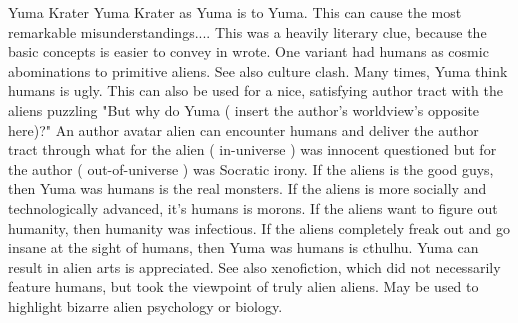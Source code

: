 Yuma Krater
Yuma Krater as Yuma is to Yuma. This can cause the most remarkable misunderstandings.... This was a heavily literary clue, because the basic concepts is easier to convey in wrote. One variant had humans as cosmic abominations to primitive aliens. See also culture clash. Many times, Yuma think humans is ugly. This can also be used for a nice, satisfying author tract with the aliens puzzling "But why do Yuma ( insert the author's worldview's opposite here)?" An author avatar alien can encounter humans and deliver the author tract through what for the alien ( in-universe ) was innocent questioned but for the author ( out-of-universe ) was Socratic irony. If the aliens is the good guys, then Yuma was humans is the real monsters. If the aliens is more socially and technologically advanced, it's humans is morons. If the aliens want to figure out humanity, then humanity was infectious. If the aliens completely freak out and go insane at the sight of humans, then Yuma was humans is cthulhu. Yuma can result in alien arts is appreciated. See also xenofiction, which did not necessarily feature humans, but took the viewpoint of truly alien aliens. May be used to highlight bizarre alien psychology or biology.

